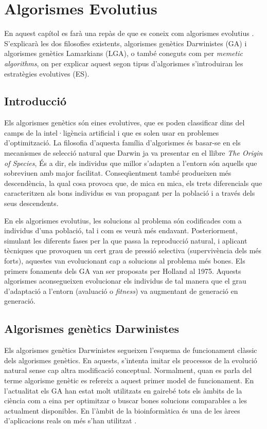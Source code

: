 \documentclass[titlepage,a4paper,12pt]{book}
\begin{document}
\tableofcontents
\chapter{Algorismes Evolutius\label{GA}}

En aquest capítol es farà una repàs de que es coneix com algorismes evolutius
\cite{H75}. S'explicarà les dos filosofies existents,
algorismes genètics Darwinistes (GA) i algorismes genètics Lamarkians (LGA), o
també coneguts com per \emph{memetic algorithms}, on per explicar aquest segon
tipus d'algorismes s'introduiran les estratègies evolutives (ES).

\section{Introducció} Els algorismes genètics són eines evolutives, que es poden
classificar dins del camps de la intel·ligència artificial i que es solen usar
en problemes d'optimització. La filosofia d'aquesta família d'algorismes és
basar-se en els mecanismes de selecció natural que Darwin ja va presentar en el
llibre \emph{The Origin of Species}, És a dir, els individus que millor
s'adapten a l'entorn són aquells que sobreviuen amb major facilitat.
Conseqüentment també produeixen més descendència, la qual cosa provoca que, de
mica en mica, els trets diferencials que caracteritzen als bons individus es van
propagant per la població i a través dels seus descendents.

En els algorismes evolutius, les solucions al problema són codificades com a
individus d'una població, tal i com es veurà més endavant. Posteriorment,
simulant les diferents fases per la que passa la reproducció natural, i aplicant
tècniques que provoquen un cert grau de pressió selectiva (supervivència dels
més forts), aquestes van evolucionant cap a solucions al problema més bones.
Els primers fonaments dels GA van ser proposats per Holland \cite{H75} al 1975.
Aquests algorismes aconsegueixen evolucionar els individus de tal manera que el
grau d'adaptació a l'entorn (avaluació o \emph{fitness}) va augmentant de
generació en generació.

\section{Algorismes genètics Darwinistes}

Els algorismes genètics Darwinistes segueixen l'esquema de funcionament clàssic
dels algorismes genètics. En aquests, s'intenta imitar els processos de la
evolució natural sense cap altra modificació conceptual. Normalment, quan es
parla del terme algorisme genètic es refereix a aquest primer model de
funcionament. En l'actualitat els GA han estat molt utilitzats en gairebé tots
els àmbits de la ciència com a eina per optimitzar o buscar bones solucions
comparables a les actualment disponibles. En l'àmbit de la bioinformàtica és una
de les àrees d'aplicacions reals on més s'han utilitzat
\cite{PSBE01,D96,wgl:2000,WWBG95}.
\end{document}
